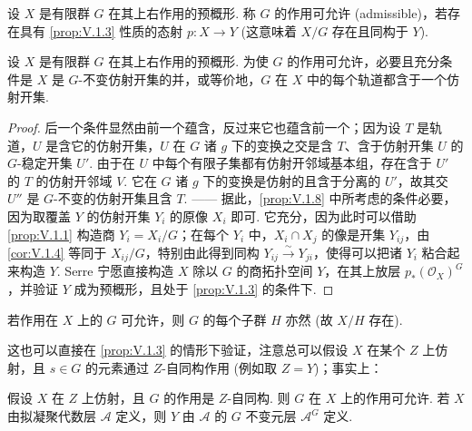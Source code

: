 \begin{definition}\label{def:V.1.7}
设 $X$ 是有限群 $G$ 在其上右作用的预概形. 称 $G$ 的作用可允许 (admissible)，若存在具有 \ref{prop:V.1.3} 性质的态射 $p \colon X \to Y$ (这意味着 $X/G$ 存在且同构于 $Y$).
\end{definition}

\begin{proposition}\label{prop:V.1.8}
设 $X$ 是有限群 $G$ 在其上右作用的预概形. 为使 $G$ 的作用可允许，必要且充分条件是 $X$ 是 $G$-不变仿射开集的并，或等价地，$G$ 在 $X$ 中的每个轨道都含于一个仿射开集.
\end{proposition}

\begin{proof}
后一个条件显然由前一个蕴含，反过来它也蕴含前一个；因为设 $T$ 是轨道，$U$ 是含它的仿射开集，$U$ 在 $G$ 诸 $g$ 下的变换之交是含 $T$、含于仿射开集 $U$ 的 $G$-稳定开集 $U'$. 由于在 $U$ 中每个有限子集都有仿射开邻域基本组，存在含于 $U'$ 的 $T$ 的仿射开邻域 $V$. 它在 $G$ 诸 $g$ 下的变换是仿射的且含于分离的 $U'$，故其交 $U''$ 是 $G$-不变的仿射开集且含 $T$. —— 据此，\ref{prop:V.1.8} 中所考虑的条件必要，因为取覆盖 $Y$ 的仿射开集 $Y_i$ 的原像 $X_i$ 即可. 它充分，因为此时可以借助 \ref{prop:V.1.1} 构造商 $Y_i = X_i/G$；在每个 $Y_i$ 中，$X_i \cap X_j$ 的像是开集 $Y_{ij}$，由 \ref{cor:V.1.4} 等同于 $X_{ij}/G$，特别由此得到同构 $Y_{ij} \xrightarrow{\sim} Y_{ji}$，使得可以把诸 $Y_i$ 粘合起来构造 $Y$. Serre 宁愿直接构造 $X$ 除以 $G$ 的商拓扑空间 $Y$，在其上放层 $p_{*}(\mathcal{O}_X)^{G}$，并验证 $Y$ 成为预概形，且处于 \ref{prop:V.1.3} 的条件下.
\end{proof}

\begingroup
\addtocounter{theorem}{-1}%
\renewcommand{\thetheorem}{\thesection.7}%
\begin{corollary}\label{cor:V.1.7sub}
若作用在 $X$ 上的 $G$ 可允许，则 $G$ 的每个子群 $H$ 亦然 (故 $X/H$ 存在).
\end{corollary}

\endgroup

这也可以直接在 \ref{prop:V.1.3} 的情形下验证，注意总可以假设 $X$ 在某个 $Z$ 上仿射，且 $s \in G$ 的元素通过 $Z$-自同构作用 (例如取 $Z = Y$)；事实上：

\begin{corollary}\label{cor:V.1.8}
假设 $X$ 在 $Z$ 上仿射，且 $G$ 的作用是 $Z$-自同构. 则 $G$ 在 $X$ 上的作用可允许. 若 $X$ 由拟凝聚代数层 $\mathcal{A}$ 定义，则 $Y$ 由 $\mathcal{A}$ 的 $G$ 不变元层 $\mathcal{A}^{G}$ 定义.
\end{corollary}

